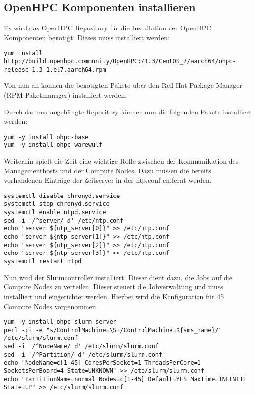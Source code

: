 \subsection{OpenHPC Komponenten installieren}
Es wird das OpenHPC Repository für die Installation der OpenHPC Komponenten benötigt. Dieses muss installiert werden:

\begin{lstlisting}
yum install http://build.openhpc.community/OpenHPC:/1.3/CentOS_7/aarch64/ohpc-release-1.3-1.el7.aarch64.rpm
\end{lstlisting}

Von nun an können die benötigten Pakete über den Red Hat Package Manager (RPM-Paketmanager) installiert werden.

Durch das neu angehängte Repository können nun die folgenden Pakete installiert werden:

\begin{lstlisting}
yum -y install ohpc-base
yum -y install ohpc-warewulf
\end{lstlisting}

Weiterhin spielt die Zeit eine wichtige Rolle zwischen der Kommunikation des Managementhosts und der Compute Nodes. Dazu müssen die bereits vorhandenen Einträge der Zeitserver in der ntp.conf entfernt werden.


\begin{lstlisting}
systemctl disable chronyd.service
systemctl stop chronyd.service
systemctl enable ntpd.service
sed -i '/^server/ d' /etc/ntp.conf
echo "server ${ntp_server[0]}" >> /etc/ntp.conf
echo "server ${ntp_server[1]}" >> /etc/ntp.conf
echo "server ${ntp_server[2]}" >> /etc/ntp.conf
echo "server ${ntp_server[3]}" >> /etc/ntp.conf
systemctl restart ntpd
\end{lstlisting}

Nun wird der Slurmcontroller installiert. Dieser dient dazu, die Jobs auf die Compute Nodes zu verteilen. Dieser steuert die Jobverwaltung und muss installiert und eingerichtet werden. Hierbei wird die Konfiguration für 45 Compute Nodes vorgenommen.

\begin{lstlisting}
yum -y install ohpc-slurm-server
perl -pi -e "s/ControlMachine=\S+/ControlMachine=${sms_name}/" /etc/slurm/slurm.conf
sed -i '/^NodeName/ d' /etc/slurm/slurm.conf
sed -i '/^Partition/ d' /etc/slurm/slurm.conf
echo "NodeName=c[1-45] CoresPerSocket=1 ThreadsPerCore=1 SocketsPerBoard=4 State=UNKNOWN" >> /etc/slurm/slurm.conf
echo "PartitionName=normal Nodes=c[1-45] Default=YES MaxTime=INFINITE State=UP" >> /etc/slurm/slurm.conf
\end{lstlisting}

